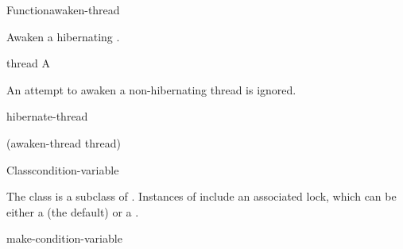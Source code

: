 \begin{functiondoc}{Function}{awaken-thread}{}
%
%

\fnsyntax

\fnpurpose Awaken a hibernating .

\fnpackage {}

\fnmodule {}

\fnargs
\begin{args}{thread}
\arg[thread] A 
\end{args}

\fnerrors
\nothreads{}

\fndescription An attempt to awaken a non-hibernating thread is ignored.

\begin{alsos}{hibernate-thread}
\end{alsos}

\fnexample
%
\W\supp
\begin{example}
  (awaken-thread thread)
\end{example}

\end{functiondoc}


\begin{functiondoc}{Class}{condition-variable}{}
%
  
\fnsyntax

\fnpackage {}

\fnmodule {}

\fndescription The class  is a subclass of
.  Instances of
 include an associated lock, which can be
either a  (the default) or a .

\begin{alsos}{make-condition-variable}
\end{alsos}

\end{functiondoc}


